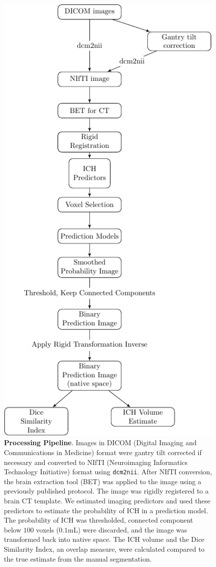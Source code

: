 \documentclass{elsarticle_nonatbib}\usepackage[]{graphicx}\usepackage[]{color}
\begin{document}


\begin{figure}
\centering
\includegraphics[width=0.5\linewidth]{Imaging_Pipeline_Flowchart_with_Rigid.pdf}
\caption{{\bf Processing Pipeline}.  Images in DICOM (Digital Imaging and Communications in Medicine) format were gantry tilt corrected if necessary and converted to NIfTI (Neuroimaging Informatics Technology Initiative) format using \texttt{dcm2nii}.  After NIfTI conversion, the brain extraction tool (BET) was applied to the image using a previously published protocol.  The image was rigidly registered to a brain CT template.  We estimated imaging predictors and used these predictors to estimate the probability of ICH in a prediction model.  The probability of ICH was thresholded, connected component below $100$ voxels ($0.1$mL) were discarded, and the image was transformed back into native space.  The ICH volume and the Dice Similarity Index, an overlap measure, were calculated compared to the true estimate from the manual segmentation.  }
\label{fig:framework}
\end{figure}
\end{document}
